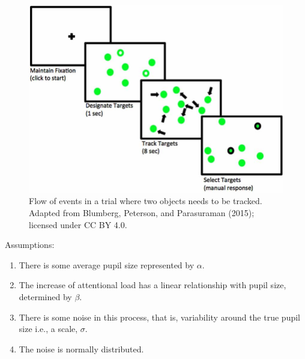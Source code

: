 \documentclass[12pt,ignorenonframetext,aspectratio=169]{beamer}
\providecommand{\tightlist}{%
  \setlength{\itemsep}{0pt}\setlength{\parskip}{0pt}}
\begin{document}
\begin{frame}



\small

\begin{figure}

{\centering \includegraphics[width=0.8\linewidth]{cc_figure/MOT} 

}

\caption{Flow of events in a trial where two objects needs to be tracked. Adapted from Blumberg, Peterson, and Parasuraman (2015); licensed under CC BY 4.0.}\label{fig:mot}
\end{figure}

\normalsize

\end{frame}

\begin{frame}

\begin{block}{Assumptions:}

\begin{enumerate}
\tightlist
\item
  There is some average pupil size represented by \(\alpha\).
\item
  The increase of attentional load has a linear relationship with pupil size, determined by \(\beta\).
\item
  There is some noise in this process, that is, variability around the true pupil size i.e., a scale, \(\sigma\).
\item
  The noise is normally distributed.
\end{enumerate}

\end{block}

\end{frame}
\end{document}
